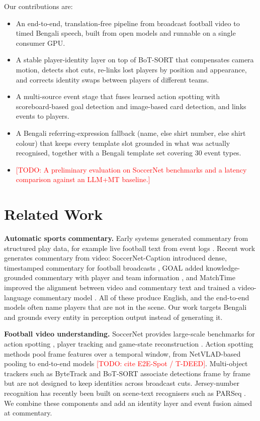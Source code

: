 \documentclass[conference]{IEEEtran}
\newcommand{\todo}[1]{\textcolor{red}{[TODO: #1]}}
\begin{document}
Our contributions are:
\begin{itemize}
\item An end-to-end, translation-free pipeline from broadcast football video to timed Bengali speech, built from open models and runnable on a single consumer GPU.
\item A stable player-identity layer on top of BoT-SORT \cite{aharon2022botsort} that compensates camera motion, detects shot cuts, re-links lost players by position and appearance, and corrects identity swaps between players of different teams.
\item A multi-source event stage that fuses learned action spotting \cite{giancola2021temporally} with scoreboard-based goal detection and image-based card detection, and links events to players.
\item A Bengali referring-expression fallback (name, else shirt number, else shirt colour) that keeps every template slot grounded in what was actually recognised, together with a Bengali template set covering 30 event types.
\item \todo{A preliminary evaluation on SoccerNet benchmarks and a latency comparison against an LLM+MT baseline.}
\end{itemize}

\section{Related Work}

\textbf{Automatic sports commentary.} Early systems generated commentary from structured play data, for example live football text from event logs \cite{taniguchi2019generating}. Recent work generates commentary from video: SoccerNet-Caption introduced dense, timestamped commentary for football broadcasts \cite{mkhallati2023soccernetcaption}, GOAL added knowledge-grounded commentary with player and team information \cite{qi2023goal}, and MatchTime improved the alignment between video and commentary text and trained a video-language commentary model \cite{rao2024matchtime}. All of these produce English, and the end-to-end models often name players that are not in the scene. Our work targets Bengali and grounds every entity in perception output instead of generating it.

\textbf{Football video understanding.} SoccerNet provides large-scale benchmarks for action spotting \cite{deliege2021soccernet}, player tracking \cite{cioppa2022soccernet} and game-state reconstruction \cite{somers2024soccernetgsr}. Action spotting methods pool frame features over a temporal window, from NetVLAD-based pooling \cite{giancola2021temporally,arandjelovic2016netvlad} to end-to-end models \todo{cite E2E-Spot / T-DEED}. Multi-object trackers such as ByteTrack \cite{zhang2022bytetrack} and BoT-SORT \cite{aharon2022botsort} associate detections frame by frame but are not designed to keep identities across broadcast cuts. Jersey-number recognition has recently been built on scene-text recognisers such as PARSeq \cite{bautista2022scene,koshkina2024general}. We combine these components and add an identity layer and event fusion aimed at commentary.
\end{document}
